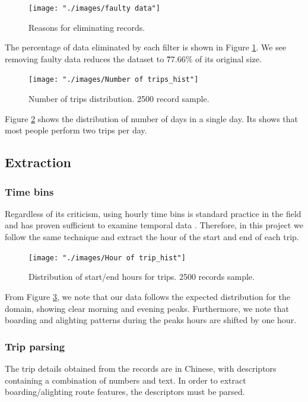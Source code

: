 \documentclass{article}
\begin{document}
\begin{figure}[H]
  \centering
  \texttt{[image: "./images/faulty data"]} %
  \caption{Reasons for eliminating records.}
  \label{fig:preprocessing/faulty}
\end{figure}

The percentage of data eliminated by each filter is shown in Figure \ref{fig:preprocessing/faulty}. We see removing faulty data reduces the dataset to \~77.66\% of its original size. 

\begin{figure}[H]
  \centering
  \texttt{[image: "./images/Number of trips\_hist"]}
  \caption{Number of trips distribution. 2500 record sample.}
  \label{fig:preprocessing/num_trips}
\end{figure}

Figure \ref{fig:preprocessing/num_trips} shows the distribution of number of days in a single day. Its shows that most people perform two trips per day. %

\subsection{Extraction}

\subsubsection{Time bins}
Regardless of its criticism, using hourly time bins is standard practice in the field and has proven sufficient to examine temporal data \cite{langlois2016inferring} \cite{ma2017understanding} \cite{morency2007measuring}. Therefore, in this project we follow the same technique and extract the hour of the start and end of each trip.

\begin{figure}[H]
  \centering
  \texttt{[image: "./images/Hour of trip\_hist"]}
  \caption{Distribution of start/end hours for trips. 2500 records sample.}
  \label{fig:preprocessing/start_end_hour}%
\end{figure}

From Figure \ref{fig:preprocessing/start_end_hour}, we note that our data follows the expected distribution for the domain, showing clear morning and evening peaks. Furthermore, we note that boarding and alighting patterns during the peaks hours are shifted by one hour. %

\subsubsection{Trip parsing} 
\label{sec:tripParsing}
The trip details obtained from the records are in Chinese, with descriptors containing a combination of numbers and text. In order to extract boarding/alighting route features, the descriptors must be parsed. 
\end{document}
